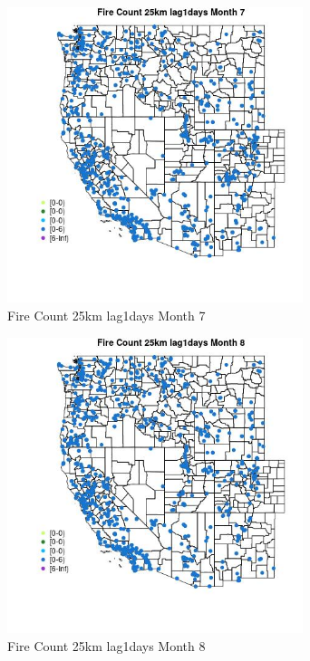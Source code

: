 \begin{figure} 
\centering  
\includegraphics[width=0.77\textwidth]{Code_Outputs/Report_ML_input_PM25_Step4_part_e_de_duplicated_aves_compiled_2019-05-21wNAs_MapObsMo7Fire_Count_25km_lag1days.jpg} 
\caption{\label{fig:Report_ML_input_PM25_Step4_part_e_de_duplicated_aves_compiled_2019-05-21wNAsMapObsMo7Fire_Count_25km_lag1days}Fire Count 25km lag1days Month 7} 
\end{figure} 
 

\begin{figure} 
\centering  
\includegraphics[width=0.77\textwidth]{Code_Outputs/Report_ML_input_PM25_Step4_part_e_de_duplicated_aves_compiled_2019-05-21wNAs_MapObsMo8Fire_Count_25km_lag1days.jpg} 
\caption{\label{fig:Report_ML_input_PM25_Step4_part_e_de_duplicated_aves_compiled_2019-05-21wNAsMapObsMo8Fire_Count_25km_lag1days}Fire Count 25km lag1days Month 8} 
\end{figure} 
 

